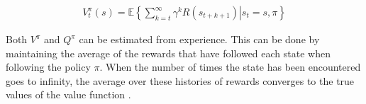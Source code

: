 \begin{align}
\label{equation:v_infinite}
V_{t}^\pi(s) = \mathbb{E} \left\{
  \left. \sum_{k=t}^\infty \gamma^k R(s_{t+k+1})
  \right\vert s_t = s,\pi
\right\}
\end{align}

Both $V^\pi$ and $Q^\pi$ can be estimated from experience. This can be done by
maintaining the average of the rewards that have followed each state when
following the policy $\pi$. When the number of times the state has been
encountered goes to infinity, the average over these histories of rewards
converges to the true values of the value function
\parencite{barto1998reinforcement}.




